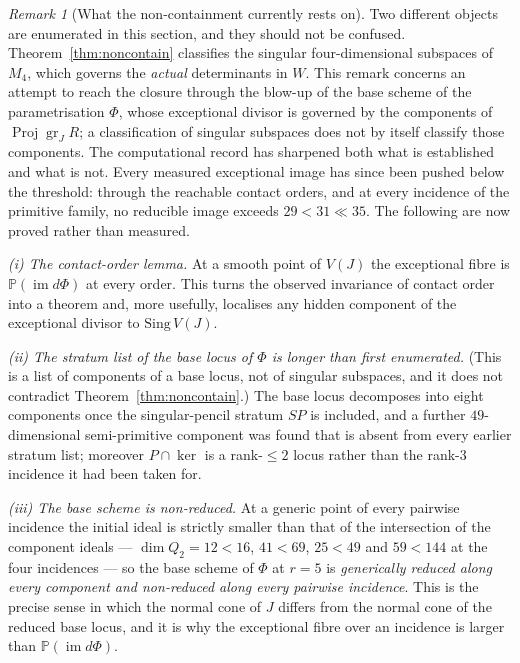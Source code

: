 \documentclass[11pt]{amsart}
\theoremstyle{plain}
\theoremstyle{definition}
\theoremstyle{remark}
\newtheorem{remark}[theorem]{Remark}
\newcommand{\bP}{\mathbb{P}}
\newcommand{\Pp}{P}
\begin{document}
\begin{remark}[What the non-containment currently rests on]\label{rem:noncontain-status}
Two different objects are enumerated in this section, and they should not be
confused.  Theorem~\ref{thm:noncontain} classifies the singular
four-dimensional subspaces of $M_4$, which governs the \emph{actual}
determinants in $W$.  This remark concerns an attempt to reach the closure
through the blow-up of the base scheme of the parametrisation $\Phi$, whose
exceptional divisor is governed by the components of
$\operatorname{Proj}\operatorname{gr}_J R$; a classification of singular
subspaces does not by itself classify those components.  The computational
record has sharpened both what is established and what is not.  Every measured exceptional image has since been pushed below the
threshold: through the reachable contact orders, and at every incidence of the
primitive family, no reducible image exceeds $29<31\ll35$.  The following are
now proved rather than measured.

\emph{(i) The contact-order lemma.}  At a smooth point of $V(J)$ the
exceptional fibre is $\bP(\operatorname{im} d\Phi)$ at every order.  This turns
the observed invariance of contact order into a theorem and, more usefully,
localises any hidden component of the exceptional divisor to $\mathrm{Sing}\,V(J)$.

\emph{(ii) The stratum list of the base locus of $\Phi$ is longer than first
enumerated.}  (This is a list of components of a base locus, not of singular
subspaces, and it does not contradict Theorem~\ref{thm:noncontain}.)  The
base locus decomposes into eight components once the singular-pencil stratum
$SP$ is included, and a further $49$-dimensional semi-primitive component was
found that is absent from every earlier stratum list; moreover $\Pp\cap\ker$ is
a rank-$\le2$ locus rather than the rank-$3$ incidence it had been taken for.

\emph{(iii) The base scheme is non-reduced.}  At a generic point of every
pairwise incidence the initial ideal is strictly smaller than that of the
intersection of the component ideals --- $\dim Q_2=12<16$, $41<69$, $25<49$ and
$59<144$ at the four incidences --- so the base scheme of $\Phi$ at $r=5$ is
\emph{generically reduced along every component and non-reduced along every
pairwise incidence}.  This is the precise sense in which the normal cone of $J$
differs from the normal cone of the reduced base locus, and it is why the
exceptional fibre over an incidence is larger than $\bP(\operatorname{im}d\Phi)$.


\end{remark}
\end{document}
